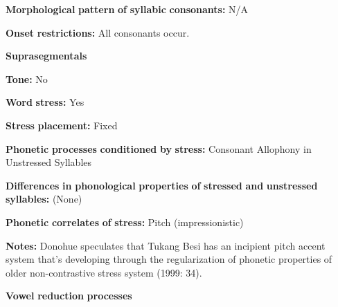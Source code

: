\documentclass[output=paper]{langsci/langscibook}
\begin{document}
\begin{styleBody}
\textbf{Morphological} \textbf{pattern} \textbf{of} \textbf{syllabic} \textbf{consonants:} N/A
\end{styleBody}

\begin{styleBody}
\textbf{Onset} \textbf{restrictions:} All consonants occur.
\end{styleBody}

\begin{styleBody}
\textbf{Suprasegmentals}
\end{styleBody}

\begin{styleBody}
\textbf{Tone:} No
\end{styleBody}

\begin{styleBody}
\textbf{Word} \textbf{stress:} Yes
\end{styleBody}

\begin{styleBody}
\textbf{Stress} \textbf{placement:} Fixed
\end{styleBody}

\begin{styleBody}
\textbf{Phonetic} \textbf{processes} \textbf{conditioned} \textbf{by} \textbf{stress:} Consonant Allophony in Unstressed Syllables
\end{styleBody}

\begin{styleBody}
\textbf{Differences} \textbf{in} \textbf{phonological} \textbf{properties} \textbf{of} \textbf{stressed} \textbf{and} \textbf{unstressed} \textbf{syllables:} (None)
\end{styleBody}

\begin{styleBody}
\textbf{Phonetic} \textbf{correlates} \textbf{of} \textbf{stress:} Pitch (impressionistic)
\end{styleBody}

\begin{styleBody}
\textbf{Notes:} Donohue speculates that Tukang Besi has an incipient pitch accent system that’s developing through the regularization of phonetic properties of older non-contrastive stress system (1999: 34).
\end{styleBody}

\begin{styleBody}
\textbf{Vowel} \textbf{reduction} \textbf{processes}
\end{styleBody}
\end{document}
